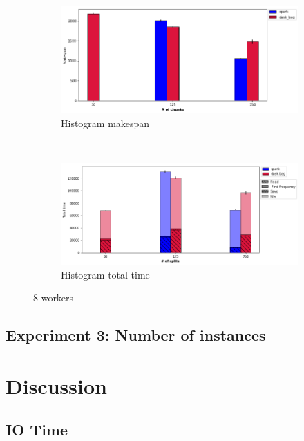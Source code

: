 \documentclass[conference]{IEEEtran}
\begin{document}
\begin{figure}[!t]
    \centering
    \begin{subfigure}[b]{\columnwidth}
        \includegraphics[clip,width=\columnwidth]{images/histo_splits.png}%
        \caption{Histogram makespan}\label{fig:histo_ms_chunk}
    \end{subfigure}
    \\
    \begin{subfigure}[b]{\columnwidth}
        \includegraphics[clip,width=\columnwidth]{images/histo_idle_splits.png}%
        \caption{Histogram total time}\label{fig:histo_tt_chunk}
    \end{subfigure}
    \caption{8 workers}
\end{figure}

\subsection{Experiment 3: Number of instances}



\section{Discussion}
\subsection{IO Time}
\end{document}

